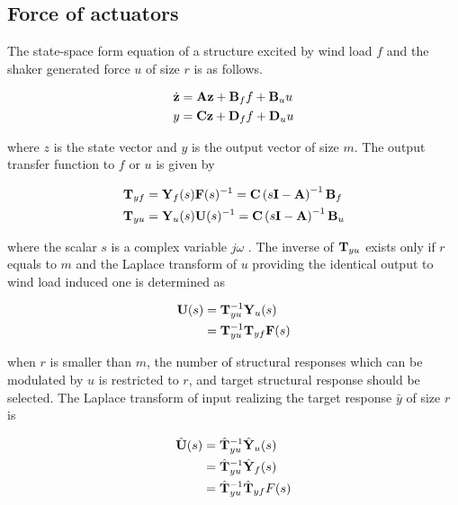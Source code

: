 \subsection{Force of actuators}
The state-space form equation of a structure excited by wind load $f$ and the shaker generated force $u$ of size $r$ is as follows.

\begin{equation}
\begin{aligned}
\dot{\mathbf{z}} &=\mathbf{A}\mathbf{z}+\mathbf{B}_{f}f + \mathbf{B}_{u}u \\
y &= \mathbf{C}\mathbf{z}+\mathbf{D}_{f}f+\mathbf{D}_{u}u
\end{aligned}
\label{eq:6-1}
\end{equation}

where $z$ is the state vector and $y$ is the output vector of size $m$. The output transfer function to $f$ or $u$ is given by

\begin{equation}
\begin{aligned}
\mathbf{T}_{yf} &= \mathbf{Y}_{f}(s)\mathbf{F}(s)^{-1} = \mathbf{C}\left(s\mathbf{I}-\mathbf{A}\right)^{-1}\mathbf{B}_{f} \\
\mathbf{T}_{yu} &= \mathbf{Y}_{u}(s)\mathbf{U}(s)^{-1} = \mathbf{C}\left(s\mathbf{I}-\mathbf{A}\right)^{-1}\mathbf{B}_{u} \\
\end{aligned}
\label{eq:6-2}
\end{equation}

where the scalar $s$ is a complex variable $j\omega$ . The inverse of $\mathbf{T}_{yu}$ exists only if $r$ equals to $m$ and the Laplace transform of $u$ providing the identical output to wind load induced one is determined as

\begin{equation}
\begin{aligned}
\mathbf{U}(s)&=\mathbf{T}_{yu}^{-1}\mathbf{Y}_{u}(s)\\
&=\mathbf{T}_{yu}^{-1}\mathbf{T}_{yf}\mathbf{F}(s)
\end{aligned}
\label{eq:6-3}
\end{equation}

when $r$ is smaller than $m$, the number of structural responses which can be modulated by $u$ is restricted to $r$, and target structural response should be selected. The Laplace transform of input realizing the target response $\bar{y}$ of size $r$ is

\begin{equation}
\begin{aligned}
\hat{\mathbf{U}}(s)&=\hat{\mathbf{T}}_{yu}^{-1}\hat{\mathbf{Y}}_{u}(s)\\
&=\hat{\mathbf{T}}_{yu}^{-1}\hat{\mathbf{Y}}_{f}(s)\\
&=\hat{\mathbf{T}}_{yu}^{-1}\hat{\mathbf{T}}_{yf}F(s)
\end{aligned}
\label{eq:6-4}
\end{equation}

